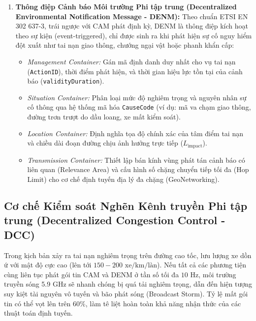 \documentclass[a4paper]{article}
\begin{document}
\begin{enumerate}
    \item \textbf{Thông điệp Cảnh báo Môi trường Phi tập trung (Decentralized Environmental Notification Message - DENM):}
    Theo chuẩn ETSI EN 302 637-3, trái ngược với CAM phát định kỳ, DENM là thông điệp kích hoạt theo sự kiện (event-triggered), chỉ được sinh ra khi phát hiện sự cố nguy hiểm đột xuất như tai nạn giao thông, chướng ngại vật hoặc phanh khẩn cấp:
    \begin{itemize}
        \item \textit{Management Container:} Gán mã định danh duy nhất cho vụ tai nạn (\texttt{ActionID}), thời điểm phát hiện, và thời gian hiệu lực tồn tại của cảnh báo (\texttt{validityDuration}).
        \item \textit{Situation Container:} Phân loại mức độ nghiêm trọng và nguyên nhân sự cố thông qua hệ thống mã hóa \texttt{CauseCode} (ví dụ: mã va chạm giao thông, đường trơn trượt do dầu loang, xe mất kiểm soát).
        \item \textit{Location Container:} Định nghĩa tọa độ chính xác của tâm điểm tai nạn và chiều dài đoạn đường chịu ảnh hưởng trực tiếp ($L_{\text{impact}}$).
        \item \textit{Transmission Container:} Thiết lập bán kính vùng phát tán cảnh báo có liên quan (Relevance Area) và cấu hình số chặng chuyển tiếp tối đa (Hop Limit) cho cơ chế định tuyến địa lý đa chặng (GeoNetworking).
    \end{itemize}
\end{enumerate}

\subsection{Cơ chế Kiểm soát Nghẽn Kênh truyền Phi tập trung (Decentralized Congestion Control - DCC)}
Trong kịch bản xảy ra tai nạn nghiêm trọng trên đường cao tốc, lưu lượng xe dồn ứ với mật độ cực cao (lên tới $150 - 200\text{ xe/km/làn}$). Nếu tất cả các phương tiện cùng liên tục phát gói tin CAM và DENM ở tần số tối đa $10\text{ Hz}$, môi trường truyền sóng 5.9 GHz sẽ nhanh chóng bị quá tải nghiêm trọng, dẫn đến hiện tượng suy kiệt tài nguyên vô tuyến và bão phát sóng (Broadcast Storm). Tỷ lệ mất gói tin có thể vọt lên trên $60\%$, làm tê liệt hoàn toàn khả năng nhận thức của các thuật toán định tuyến.
\end{document}
